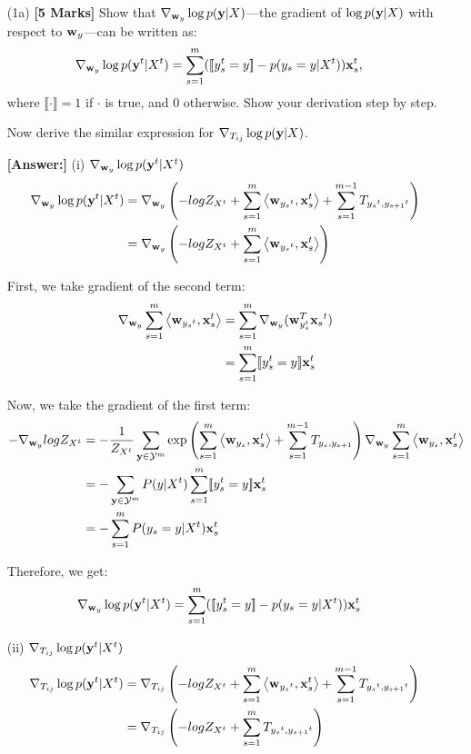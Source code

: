 \documentclass[11pt]{report}
\begin{document}
\begin{itemize}
	\item[(1a)] {\bf [5 Marks]} Show that ${\nabla}_{\mathbf{\boldsymbol{w}}_y} \log p(\mathbf{\boldsymbol{y}}|X)$---the gradient of $\log p(\mathbf{\boldsymbol{y}}|X)$ with respect to $\mathbf{\boldsymbol{w}}_y$---can be written as:
	\begin{align}
		{\nabla}_{\mathbf{\boldsymbol{w}}_y} \log p(\mathbf{\boldsymbol{y}}^t|X^t) &= \sum_{s=1}^m ([\![y^t_s = y]\!] - p(y_s = y | X^t)) \mathbf{\boldsymbol{x}}^t_s,
	\end{align}
	where $\llbracket \cdot \rrbracket = 1$ if $\cdot$ is true, and 0 otherwise.
	Show your derivation step by step.
	
	Now derive the similar expression for ${\nabla}_{T_{ij}} \log p(\mathbf{\boldsymbol{y}}|X)$.
	
	{\bf [Answer:]} 
	(i) ${\nabla}_{\mathbf{\boldsymbol{w}}_y} \log p(\mathbf{\boldsymbol{y}}^t|X^t)$
	\begin{align}
		{\nabla}_{\mathbf{\boldsymbol{w}}_y} \log p(\mathbf{\boldsymbol{y}}^t|X^t) &= {\nabla}_{\mathbf{\boldsymbol{w}}_y} \left(-logZ_{X^t} + \sum_{s=1}^m \left\langle \mathbf{\boldsymbol{w}}_{{y_s}^t},\mathbf{\boldsymbol{x}}_s^t \right\rangle + \sum_{s=1}^{m-1} T_{{y_s}^t, {y_{s+1}}^t}\right) \\ 
		&={\nabla}_{\mathbf{\boldsymbol{w}}_y} \left(-logZ_{X^t} + \sum_{s=1}^m \left\langle \mathbf{\boldsymbol{w}}_{{y_s}^t},\mathbf{\boldsymbol{x}}_s^t \right\rangle\right)
	\end{align}

	First, we take gradient of the second term: 
	\begin{align}
		{\nabla}_{\mathbf{\boldsymbol{w}}_y} \sum_{s=1}^m \left\langle \mathbf{\boldsymbol{w}}_{{y_s}^t},\mathbf{\boldsymbol{x}}_s^t \right\rangle &= \sum_{s=1}^m {\nabla}_{\mathbf{\boldsymbol{w}}_y} (\mathbf{\boldsymbol{w}}_{y_s^t}^T {{\mathbf{\boldsymbol{x}}_s}^t}) \\
		&= \sum_{s=1}^m [\![y^t_s = y]\!] \mathbf{\boldsymbol{x}}^t_s
	\end{align}

	Now, we take the gradient of the first term: 
	\begin{align}
		-{\nabla}_{\mathbf{\boldsymbol{w}}_y} logZ_{X^t} &= -\frac{1}{Z_{X^t}} \sum_{\mathbf{\boldsymbol{y}} \in \mathcal{Y}^m}\exp \left(\sum_{s=1}^m \left\langle \mathbf{\boldsymbol{w}}_{y_s},\mathbf{\boldsymbol{x}}_s^t \right\rangle + \sum_{s=1}^{m-1} T_{y_s, y_{s+1}}\right) {\nabla}_{\mathbf{\boldsymbol{w}}_y} \sum_{s=1}^m \left\langle \mathbf{\boldsymbol{w}}_{y_s},\mathbf{\boldsymbol{x}}_s^t \right\rangle \\
		&= -\sum_{\mathbf{\boldsymbol{y}} \in \mathcal{Y}^m}P(y|X^t) \sum_{s=1}^m [\![y^t_s = y]\!] \mathbf{\boldsymbol{x}}^t_s \\
		&= -\sum_{s=1}^m P(y_s = y|X^t)\mathbf{\boldsymbol{x}}^t_s
	\end{align}

	Therefore, we get: 
	\begin{align}
		{\nabla}_{\mathbf{\boldsymbol{w}}_y} \log p(\mathbf{\boldsymbol{y}}^t|X^t) &= \sum_{s=1}^m ([\![y^t_s = y]\!] - p(y_s = y | X^t)) \mathbf{\boldsymbol{x}}^t_s
	\end{align}

	(ii) ${\nabla}_{T_{ij}} \log p(\mathbf{\boldsymbol{y}}^t|X^t)$
	\begin{align}
		{\nabla}_{T_{ij}} \log p(\mathbf{\boldsymbol{y}}^t|X^t) &= {\nabla}_{T_{ij}} \left(-logZ_{X^t} + \sum_{s=1}^m \left\langle \mathbf{\boldsymbol{w}}_{{y_s}^t},\mathbf{\boldsymbol{x}}_s^t \right\rangle + \sum_{s=1}^{m-1} T_{{y_s}^t, {y_{s+1}}^t}\right) \\ 
		&={\nabla}_{T_{ij}} \left(-logZ_{X^t} + \sum_{s=1}^m T_{{y_s}^t, {y_{s+1}}^t}\right)
	\end{align}


\end{itemize}
\end{document}
